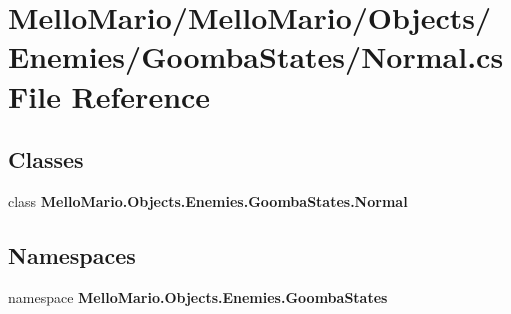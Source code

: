 \section{Mello\+Mario/\+Mello\+Mario/\+Objects/\+Enemies/\+Goomba\+States/\+Normal.cs File Reference}
\label{Enemies_2GoombaStates_2Normal_8cs}
\subsection*{Classes}
\begin{DoxyCompactItemize}
\item 
class \textbf{ Mello\+Mario.\+Objects.\+Enemies.\+Goomba\+States.\+Normal}
\end{DoxyCompactItemize}
\subsection*{Namespaces}
\begin{DoxyCompactItemize}
\item 
namespace \textbf{ Mello\+Mario.\+Objects.\+Enemies.\+Goomba\+States}
\end{DoxyCompactItemize}
